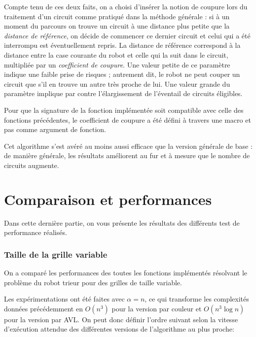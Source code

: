 \documentclass[12pt,a4paper]{article}
\begin{document}
Compte tenu de ces deux faits, on a choisi d'ins\'erer la notion de coupure 
lors du traitement d'un circuit comme pratiqu\'e dans la m\'ethode g\'en\'erale 
: si \`a un moment du parcours on trouve un circuit \`a une distance plus 
petite que la {\itshape distance de r\'ef\'erence}, on d\'ecide de 
commencer ce dernier circuit et celui qui a \'et\'e interrompu est 
\'eventuellement repris. La distance de r\'ef\'erence correspond \`a la 
distance entre la case courante du robot et celle qui la suit dans le circuit, 
multipli\'ee par un {\itshape coefficient de coupure}. Une valeur petite de 
ce param\`etre indique une faible prise de risques ; autrement dit, le robot ne 
peut couper un circuit que s'il en trouve un autre tr\`es proche de lui. Une 
valeur grande du param\`etre implique par contre l'\'elargissement de 
l'\'eventail de circuits \'eligibles.

Pour que la signature de la fonction impl\'ement\'ee 
soit compatible avec celle des fonctions pr\'ec\'edentes, le coefficient de 
coupure a \'et\'e d\'efini \`a travers une macro et pas comme argument de 
fonction.

Cet algorithme s'est av\'er\'e au moins aussi efficace que la version 
g\'en\'erale de base : de mani\`ere g\'en\'erale, les r\'esultats 
am\'eliorent au fur et \`a mesure que le nombre de circuits augmente.

\newpage

\part{Comparaison et performances}
Dans cette derni\`ere partie, on vous pr\'esente les r\'esultats des 
diff\'erents test de performance r\'ealis\'es.

\section{Taille de la grille variable}
On a compar\'e les performances des toutes les fonctions 
impl\'ement\'es r\'esolvant le probl\`eme du robot trieur pour des grilles de 
taille variable.

Les exp\'erimentations ont \'et\'e faites avec $\alpha = n$,
ce qui transforme les complexit\'es donn\'ees 
pr\'ec\'edemment en $O(n^3)$ pour la version par couleur et $O(n^3\log n)$ pour 
la version par AVL. On peut donc d\'efinir l'ordre suivant selon la 
vitesse d'ex\'ecution attendue des diff\'erentes versions de l'algorithme au 
plus proche:
\end{document}
